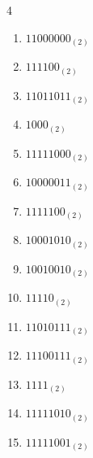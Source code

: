 \begin{multicols}{4}
\begin{enumerate}
        \phantom{$=69$}

  \item $11000000_{(2)}$

        \phantom{$=192$}

\columnbreak %

  \item $111100_{(2)}$

        \phantom{$=60$}

  \item $11011011_{(2)}$

        \phantom{$=219$}

  \item $1000_{(2)}$

        \phantom{$=8$}

  \item $11111000_{(2)}$

        \phantom{$=248$}

  \item $10000011_{(2)}$

        \phantom{$=131$}

  \item $1111100_{(2)}$

        \phantom{$=124$}

  \item $10001010_{(2)}$

        \phantom{$=138$}

  \item $10010010_{(2)}$

        \phantom{$=146$}

  \item $11110_{(2)}$

        \phantom{$=30$}

  \item $11010111_{(2)}$

        \phantom{$=215$}

  \item $11100111_{(2)}$

        \phantom{$=231$}

  \item $1111_{(2)}$

        \phantom{$=15$}

  \item $11111010_{(2)}$

        \phantom{$=250$}

  \item $11111001_{(2)}$


\end{enumerate}
\end{multicols}
